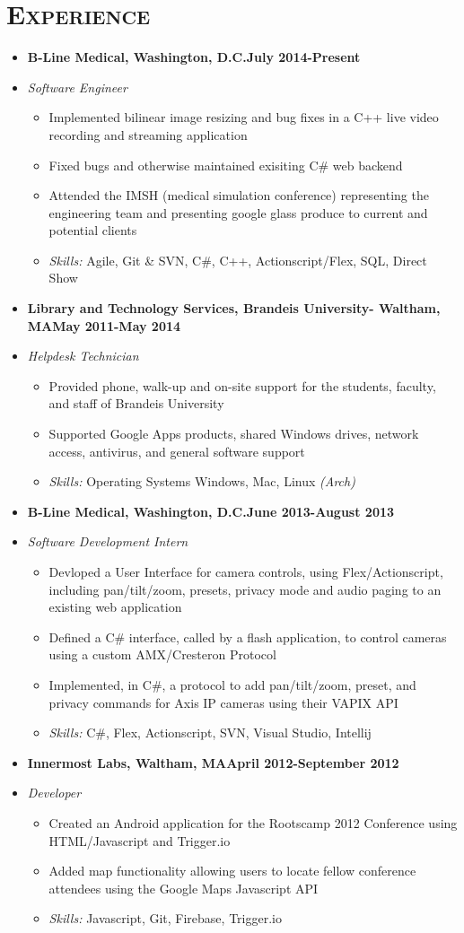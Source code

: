 \documentclass[10pt, oneside]{article}
\newcommand{\lr}[2]{#1\hfill#2}
\newcommand{\skills}[1]{
\item[] \textsl{Skills:} #1
}
\newenvironment{ressection}[1]{
  \section{\normalsize \scshape \selectfont #1 \normalfont}
  \vspace{-4pt}
  \begin{itemize} \itemsep-2pt
  }{
  \end{itemize}
  \vspace{-20pt}
}
\newenvironment{resitem}[4]{
\item[] \lr{\bfseries \selectfont #1\normalfont, #2} {#3}
\item[] \textsl{#4}
  \vspace{-4pt}
  \begin{itemize} \itemsep-2pt
  }{
  \end{itemize}
}
\begin{document}
\begin{ressection}{Experience}
  \begin {resitem}{B-Line Medical}{Washington, D.C.}{July 2014-Present}{Software Engineer} 
  \item Implemented bilinear image resizing and  bug fixes in a C++ live video recording and streaming application
  \item Fixed bugs and otherwise maintained exisiting C\# web backend 
  \item Attended the IMSH (medical simulation conference) representing the engineering team and presenting google glass produce to current and potential clients
    \skills{Agile, Git \& SVN, C\#, C++, Actionscript/Flex, SQL, Direct Show}
  \end{resitem}
  \begin{resitem}{Library and Technology Services}{Brandeis University- Waltham, MA}{May 2011-May 2014}{Helpdesk Technician} 
  \item Provided phone, walk-up and on-site support for the students, faculty, and staff of Brandeis University
  \item Supported Google Apps products, shared Windows drives, network access, antivirus, and general software support 
    \skills{Operating Systems Windows, Mac, Linux \textsl{(Arch)}}
  \end{resitem}
  \begin{resitem}{B-Line Medical}{Washington, D.C.}{June 2013-August 2013}{Software Development Intern}
  \item Devloped a User Interface for camera controls, using Flex/Actionscript, including pan/tilt/zoom, presets, privacy mode and audio paging to an existing web application
  \item Defined a C\# interface, called by a flash application, to control cameras using a custom AMX/Cresteron Protocol
  \item Implemented, in C\#, a protocol to add pan/tilt/zoom, preset, and privacy commands for Axis IP cameras using their VAPIX API
    \skills{C\#, Flex, Actionscript, SVN, Visual Studio, Intellij}
  \end{resitem}
  \begin{resitem}{Innermost Labs}{Waltham, MA}{April 2012-September 2012}{Developer}
  \item Created an Android application for the Rootscamp 2012 Conference using HTML/Javascript and Trigger.io
  \item Added map functionality allowing users to locate fellow conference attendees  using the Google Maps Javascript API
    \skills{Javascript, Git, Firebase, Trigger.io}
  \end{resitem}
\end{ressection}
\end{document}
